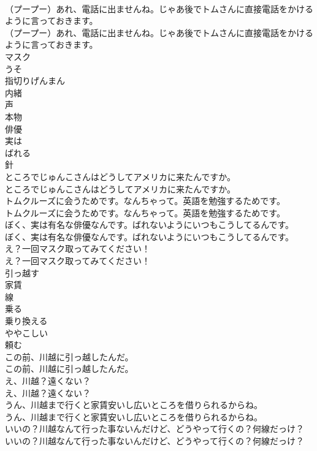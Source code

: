 \documentclass[8pt]{extreport}
\begin{document}
\begin{CJK}{UTF8}{min}
\\	（プープー）あれ、電話に出ませんね。じゃあ後でトムさんに直接電話をかけるように言っておきます。	
\\	（プープー）あれ、電話に出ませんね。じゃあ後でトムさんに直接電話をかけるように言っておきます。 
\\	マスク
\\	うそ
\\	指切りげんまん
\\	内緒
\\	声
\\	本物
\\	俳優
\\	実は
\\	ばれる
\\	針
\\	ところでじゅんこさんはどうしてアメリカに来たんですか。	
\\	ところでじゅんこさんはどうしてアメリカに来たんですか。 
\\	トムクルーズに会うためです。なんちゃって。英語を勉強するためです。	
\\	トムクルーズに会うためです。なんちゃって。英語を勉強するためです。 
\\	ぼく、実は有名な俳優なんです。ばれないようにいつもこうしてるんです。	
\\	ぼく、実は有名な俳優なんです。ばれないようにいつもこうしてるんです。 
\\	え？一回マスク取ってみてください！	
\\	え？一回マスク取ってみてください！ 
\\	引っ越す
\\	家賃
\\	線
\\	乗る
\\	乗り換える
\\	ややこしい
\\	頼む
\\	この前、川越に引っ越したんだ。	
\\	この前、川越に引っ越したんだ。 
\\	え、川越？遠くない？	
\\	え、川越？遠くない？ 
\\	うん、川越まで行くと家賃安いし広いところを借りられるからね。	
\\	うん、川越まで行くと家賃安いし広いところを借りられるからね。 
\\	いいの？川越なんて行った事ないんだけど、どうやって行くの？何線だっけ？	
\\	いいの？川越なんて行った事ないんだけど、どうやって行くの？何線だっけ？ 

\end{CJK}
\end{document}
